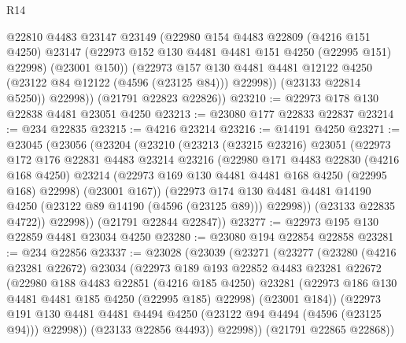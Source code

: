 \begin{lexlean}{R14}
\begin{coremodule}
              @22810
              @4483
              @23147
              @23149
              (@22980
                @154
                @4483
                @22809
                (@4216 @151 @4250)
                @23147
                (@22973 @152 @130 @4481 @4481 @151 @4250 (@22995 @151) @22998)
                (@23001 @150))
              (@22973
                @157
                @130
                @4481
                @4481
                @12122
                @4250
                (@23122 @84 @12122 (@4596 (@23125 @84)))
                @22998))
            (@23133 @22814 @5250))
          @22998))
      (@21791 @22823 @22826))
@23210 := @22973 @178 @130 @22838 @4481 @23051 @4250
@23213 := @23080 @177 @22833 @22837
@23214 := @234 @22835
@23215 := @4216 @23214
@23216 := @14191 @4250
@23271 := @23045
    (@23056
      (@23204
        (@23210
          (@23213
            (@23215 @23216)
            @23051
            (@22973
              @172
              @176
              @22831
              @4483
              @23214
              @23216
              (@22980
                @171
                @4483
                @22830
                (@4216 @168 @4250)
                @23214
                (@22973 @169 @130 @4481 @4481 @168 @4250 (@22995 @168) @22998)
                (@23001 @167))
              (@22973
                @174
                @130
                @4481
                @4481
                @14190
                @4250
                (@23122 @89 @14190 (@4596 (@23125 @89)))
                @22998))
            (@23133 @22835 @4722))
          @22998))
      (@21791 @22844 @22847))
@23277 := @22973 @195 @130 @22859 @4481 @23034 @4250
@23280 := @23080 @194 @22854 @22858
@23281 := @234 @22856
@23337 := @23028
    (@23039
      (@23271
        (@23277
          (@23280
            (@4216 @23281 @22672)
            @23034
            (@22973
              @189
              @193
              @22852
              @4483
              @23281
              @22672
              (@22980
                @188
                @4483
                @22851
                (@4216 @185 @4250)
                @23281
                (@22973 @186 @130 @4481 @4481 @185 @4250 (@22995 @185) @22998)
                (@23001 @184))
              (@22973
                @191
                @130
                @4481
                @4481
                @4494
                @4250
                (@23122 @94 @4494 (@4596 (@23125 @94)))
                @22998))
            (@23133 @22856 @4493))
          @22998))
      (@21791 @22865 @22868))

\end{coremodule}
\end{lexlean}
